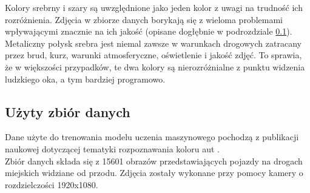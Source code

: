 Kolory srebrny i szary są uwzględnione jako jeden kolor z uwagi na trudność ich rozróżnienia. Zdjęcia w zbiorze danych borykają się z wieloma problemami wpływającymi znacznie na ich jakość (opisane dogłębnie w podrozdziale \ref{sec:dataset}). Metaliczny połysk srebra jest niemal zawsze w warunkach drogowych zatracany przez brud, kurz, warunki atmosferyczne, oświetlenie i jakość zdjęć. To sprawia, że w większości przypadków, te dwa kolory są nierozróżnialne z punktu widzenia ludzkiego oka, a tym bardziej programowo.

\subsection{Użyty zbiór danych}
\label{sec:dataset}

Dane użyte do trenowania modelu uczenia maszynowego pochodzą z publikacji naukowej dotyczącej tematyki rozpoznawania koloru aut \cite{chen_ref}.\\

Zbiór danych składa się z 15601 obrazów przedstawiających pojazdy na drogach miejskich widziane od przodu. Zdjęcia zostały wykonane przy pomocy kamery o rozdzielczości 1920x1080.

